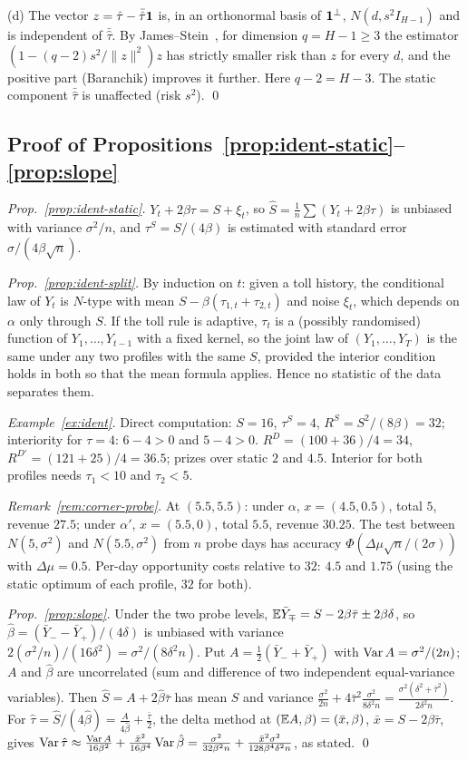 (d) The vector $z=\hat\tau-\bar{\hat\tau}\mathbf{1}$ is, in an orthonormal basis of $\mathbf{1}^\perp$, $N(d,s^2I_{H-1})$ and is independent of $\bar{\hat\tau}$. By James--Stein~\cite{jamesstein1961}, for dimension $q=H-1\ge3$ the estimator $(1-(q-2)s^2/\|z\|^2)z$ has strictly smaller risk than $z$ for every $d$, and the positive part (Baranchik) improves it further. Here $q-2=H-3$. The static component $\bar{\hat\tau}$ is unaffected (risk $s^2$). \qed

\subsection{Proof of Propositions~\ref{prop:ident-static}--\ref{prop:slope}}
\emph{Prop.~\ref{prop:ident-static}.} $Y_t+2\beta\tau=S+\xi_t$, so $\hat S=\frac1n\sum(Y_t+2\beta\tau)$ is unbiased with variance $\sigma^2/n$, and $\tau^S=S/(4\beta)$ is estimated with standard error $\sigma/(4\beta\sqrt n)$.

\emph{Prop.~\ref{prop:ident-split}.} By induction on $t$: given a toll history, the conditional law of $Y_t$ is $N$-type with mean $S-\beta(\tau_{1,t}+\tau_{2,t})$ and noise $\xi_t$, which depends on $\alpha$ only through $S$. If the toll rule is adaptive, $\tau_t$ is a (possibly randomised) function of $Y_1,\dots,Y_{t-1}$ with a fixed kernel, so the joint law of $(Y_1,\dots,Y_T)$ is the same under any two profiles with the same $S$, provided the interior condition holds in both so that the mean formula applies. Hence no statistic of the data separates them.

\emph{Example~\ref{ex:ident}.} Direct computation: $S=16$, $\tau^S=4$, $R^S=S^2/(8\beta)=32$; interiority for $\tau=4$: $6-4>0$ and $5-4>0$. $R^D=(100+36)/4=34$, $R^{D\prime}=(121+25)/4=36.5$; prizes over static $2$ and $4.5$. Interior for both profiles needs $\tau_1<10$ and $\tau_2<5$.

\emph{Remark~\ref{rem:corner-probe}.} At $(5.5,5.5)$: under $\alpha$, $x=(4.5,0.5)$, total $5$, revenue $27.5$; under $\alpha'$, $x=(5.5,0)$, total $5.5$, revenue $30.25$. The test between $N(5,\sigma^2)$ and $N(5.5,\sigma^2)$ from $n$ probe days has accuracy $\Phi(\Delta\mu\sqrt n/(2\sigma))$ with $\Delta\mu=0.5$. Per-day opportunity costs relative to $32$: $4.5$ and $1.75$ (using the static optimum of each profile, $32$ for both).

\emph{Prop.~\ref{prop:slope}.} Under the two probe levels, $\mathbb{E}\bar Y_\mp=S-2\beta\bar\tau\pm2\beta\delta$, so $\hat\beta=(\bar Y_--\bar Y_+)/(4\delta)$ is unbiased with variance $2(\sigma^2/n)/(16\delta^2)=\sigma^2/(8\delta^2n)$. Put $A=\frac12(\bar Y_-+\bar Y_+)$ with $\operatorname{Var} A=\sigma^2/(2n)$; $A$ and $\hat\beta$ are uncorrelated (sum and difference of two independent equal-variance variables). Then $\hat S=A+2\hat\beta\bar\tau$ has mean $S$ and variance $\frac{\sigma^2}{2n}+4\bar\tau^2\frac{\sigma^2}{8\delta^2n}=\frac{\sigma^2(\delta^2+\bar\tau^2)}{2\delta^2n}$. For $\hat\tau=\hat S/(4\hat\beta)=\frac{A}{4\hat\beta}+\frac{\bar\tau}2$, the delta method at $(\mathbb{E} A,\beta)=(\bar x,\beta)$, $\bar x=S-2\beta\bar\tau$, gives $\operatorname{Var}\hat\tau\approx\frac{\operatorname{Var} A}{16\beta^2}+\frac{\bar x^2}{16\beta^4}\operatorname{Var}\hat\beta=\frac{\sigma^2}{32\beta^2n}+\frac{\bar x^2\sigma^2}{128\beta^4\delta^2n}$, as stated. \qed

